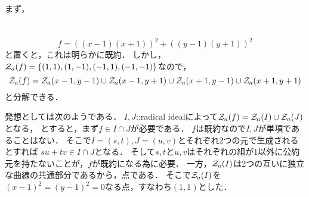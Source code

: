 \documentclass[a4paper]{jarticle}
\begin{document}
    まず，
    
\section{}
    \[ f=((x-1)(x+1))^2+((y-1)(y+1))^2 \]
    と置くと，これは明らかに既約．
    しかし，$\mathcal{Z}_a(f)=\{ (1,1), (1,-1), (-1,1), (-1,-1) \}$なので，
    \[ \mathcal{Z}_a(f)=\mathcal{Z}_a(x-1,y-1) \cup \mathcal{Z}_a(x-1,y+1) \cup \mathcal{Z}_a(x+1,y-1) \cup \mathcal{Z}_a(x+1,y+1)\]
    と分解できる．

    発想としては次のようである．
    $I,J$::radical idealによって$\mathcal{Z}_a(f)=\mathcal{Z}_a(I) \cup \mathcal{Z}_a(J)$となる，
    とすると，まず$f \in I \cap J$が必要である．
    $f$は既約なので$I,J$が単項であることはない．
    そこで$I=(s,t), J=(u,v)$とそれぞれ2つの元で生成されるとすれば
    $su+tv \in I \cap J$となる．
    そして$s,t$と$u,v$はそれぞれの組が1以外に公約元を持たないことが，$f$が既約になる為に必要．
    一方，$\mathcal{Z}_a(I)$は2つの互いに独立な曲線の共通部分であるから，点である．
    そこで$\mathcal{Z}_a(I)$を$(x-1)^2=(y-1)^2=0$なる点，すなわち$(1,1)$とした．
\end{document}
